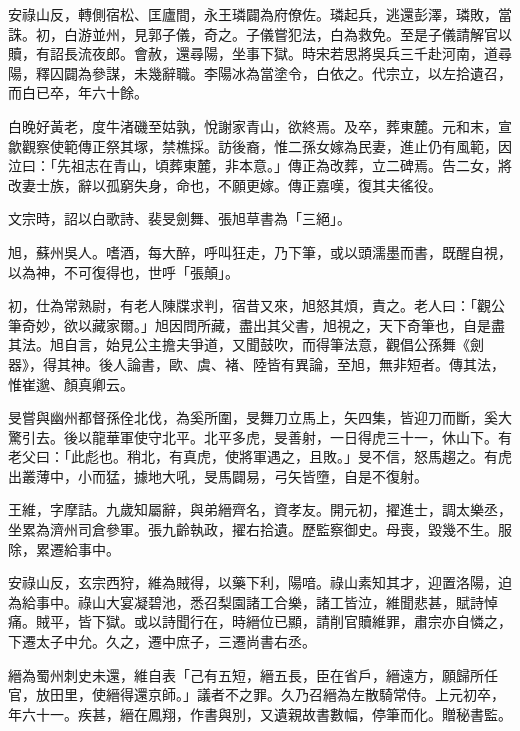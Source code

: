 \begin{pinyinscope}
 安祿山反，轉側宿松、匡廬間，永王璘闢為府僚佐。璘起兵，逃還彭澤，璘敗，當誅。初，白游並州，見郭子儀，奇之。子儀嘗犯法，白為救免。至是子儀請解官以贖，有詔長流夜郎。會赦，還尋陽，坐事下獄。時宋若思將吳兵三千赴河南，道尋陽，釋囚闢為參謀，未幾辭職。李陽冰為當塗令，白依之。代宗立，以左拾遺召，而白已卒，年六十餘。



 白晚好黃老，度牛渚磯至姑孰，悅謝家青山，欲終焉。及卒，葬東麓。元和末，宣歙觀察使範傳正祭其塚，禁樵採。訪後裔，惟二孫女嫁為民妻，進止仍有風範，因泣曰：「先祖志在青山，頃葬東麓，非本意。」傳正為改葬，立二碑焉。告二女，將改妻士族，辭以孤窮失身，命也，不願更嫁。傳正嘉嘆，復其夫徭役。



 文宗時，詔以白歌詩、裴旻劍舞、張旭草書為「三絕」。



 旭，蘇州吳人。嗜酒，每大醉，呼叫狂走，乃下筆，或以頭濡墨而書，既醒自視，以為神，不可復得也，世呼「張顛」。



 初，仕為常熟尉，有老人陳牒求判，宿昔又來，旭怒其煩，責之。老人曰：「觀公筆奇妙，欲以藏家爾。」旭因問所藏，盡出其父書，旭視之，天下奇筆也，自是盡其法。旭自言，始見公主擔夫爭道，又聞鼓吹，而得筆法意，觀倡公孫舞《劍器》，得其神。後人論書，歐、虞、褚、陸皆有異論，至旭，無非短者。傳其法，惟崔邈、顏真卿云。



 旻嘗與幽州都督孫佺北伐，為奚所圍，旻舞刀立馬上，矢四集，皆迎刀而斷，奚大驚引去。後以龍華軍使守北平。北平多虎，旻善射，一日得虎三十一，休山下。有老父曰：「此彪也。稍北，有真虎，使將軍遇之，且敗。」旻不信，怒馬趨之。有虎出叢薄中，小而猛，據地大吼，旻馬闢易，弓矢皆墮，自是不復射。



 王維，字摩詰。九歲知屬辭，與弟縉齊名，資孝友。開元初，擢進士，調太樂丞，坐累為濟州司倉參軍。張九齡執政，擢右拾遺。歷監察御史。母喪，毀幾不生。服除，累遷給事中。



 安祿山反，玄宗西狩，維為賊得，以藥下利，陽喑。祿山素知其才，迎置洛陽，迫為給事中。祿山大宴凝碧池，悉召梨園諸工合樂，諸工皆泣，維聞悲甚，賦詩悼痛。賊平，皆下獄。或以詩聞行在，時縉位已顯，請削官贖維罪，肅宗亦自憐之，下遷太子中允。久之，遷中庶子，三遷尚書右丞。



 縉為蜀州刺史未還，維自表「己有五短，縉五長，臣在省戶，縉遠方，願歸所任官，放田里，使縉得還京師。」議者不之罪。久乃召縉為左散騎常侍。上元初卒，年六十一。疾甚，縉在鳳翔，作書與別，又遺親故書數幅，停筆而化。贈秘書監。




\end{pinyinscope}
